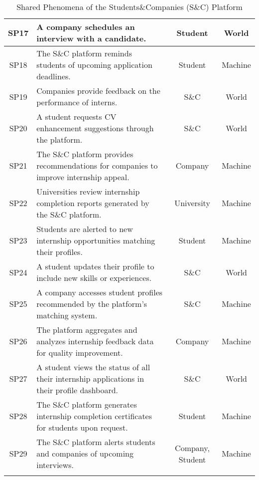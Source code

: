 \begin{longtable}{|c|p{5cm}|c|c|}
SP17 & A company schedules an interview with a candidate. & Student & World \\ \hline
SP18 & The S\&C platform reminds students of upcoming application deadlines. & Student & Machine \\ \hline
SP19 & Companies provide feedback on the performance of interns. & S\&C & World \\ \hline
SP20 & A student requests CV enhancement suggestions through the platform. & S\&C & World \\ \hline
SP21 & The S\&C platform provides recommendations for companies to improve internship appeal. & Company & Machine \\ \hline
SP22 & Universities review internship completion reports generated by the S\&C platform. & University & Machine \\ \hline
SP23 & Students are alerted to new internship opportunities matching their profiles. & Student & Machine \\ \hline
SP24 & A student updates their profile to include new skills or experiences. & S\&C & World \\ \hline
SP25 & A company accesses student profiles recommended by the platform’s matching system. & S\&C & Machine \\ \hline
SP26 & The platform aggregates and analyzes internship feedback data for quality improvement. & Company & Machine \\ \hline
SP27 & A student views the status of all their internship applications in their profile dashboard. & S\&C & World \\ \hline
SP28 & The S\&C platform generates internship completion certificates for students upon request. & Student & Machine \\ \hline
SP29 & The S\&C platform alerts students and companies of upcoming interviews. & Company, Student & Machine \\ \hline
\caption{Shared Phenomena of the Students\&Companies (S\&C) Platform}
\end{longtable}

